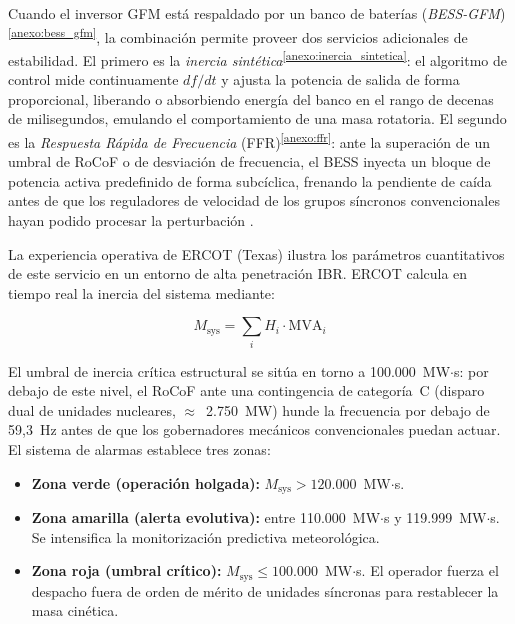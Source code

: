 Cuando el inversor GFM está respaldado por un banco de baterías
(\textit{BESS-GFM})\textsuperscript{\ref{anexo:bess_gfm}}, la
combinación permite proveer dos servicios adicionales de estabilidad. El
primero es la \textit{inercia
sintética}\textsuperscript{\ref{anexo:inercia_sintetica}}: el algoritmo
de control mide continuamente $df/dt$ y ajusta la potencia de salida de
forma proporcional, liberando o absorbiendo energía del banco en el rango
de decenas de milisegundos, emulando el comportamiento de una masa
rotatoria. El segundo es la \textit{Respuesta Rápida de Frecuencia}
(FFR)\textsuperscript{\ref{anexo:ffr}}: ante la superación de un umbral
de RoCoF o de desviación de frecuencia, el BESS inyecta un bloque de
potencia activa predefinido de forma subcíclica, frenando la pendiente
de caída antes de que los reguladores de velocidad de los grupos síncronos
convencionales hayan podido procesar la perturbación
\cite{nrel2025,futured2024}.

La experiencia operativa de ERCOT (Texas) ilustra los parámetros
cuantitativos de este servicio en un entorno de alta penetración IBR.
ERCOT calcula en tiempo real la inercia del sistema mediante:

\begin{equation}
    M_{\mathrm{sys}} = \sum_{i} H_i \cdot \mathrm{MVA}_i
    \label{eq:ercot_inercia}
\end{equation}

El umbral de inercia crítica estructural se sitúa en torno a
100.000~MW$\cdot$s: por debajo de este nivel, el RoCoF ante una
contingencia de categoría~C (disparo dual de unidades nucleares,
$\approx$~2.750~MW) hunde la frecuencia por debajo de 59{,}3~Hz antes
de que los gobernadores mecánicos convencionales puedan actuar. El
sistema de alarmas establece tres zonas:

\begin{itemize}
    \item \textbf{Zona verde (operación holgada):}
    $M_{\mathrm{sys}} > 120.000$~MW$\cdot$s.
    \item \textbf{Zona amarilla (alerta evolutiva):} entre
    110.000~MW$\cdot$s y 119.999~MW$\cdot$s. Se intensifica la
    monitorización predictiva meteorológica.
    \item \textbf{Zona roja (umbral crítico):}
    $M_{\mathrm{sys}} \leq 100.000$~MW$\cdot$s. El operador fuerza el
    despacho fuera de orden de mérito de unidades síncronas para
    restablecer la masa cinética.
\end{itemize}

